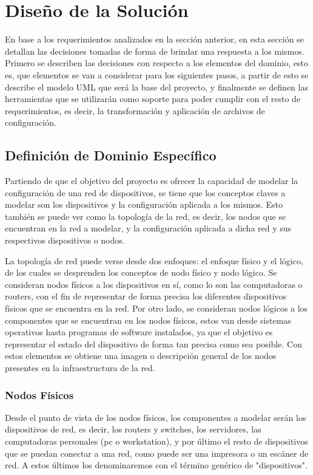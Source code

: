 \chapter{Diseño de la Solución} \label{Diseño de Solucion}
En base a los requerimientos analizados en la sección anterior, en esta sección se detallan las decisiones tomadas de forma de brindar una respuesta a los mismos. 
Primero se describen las decisiones con respecto a los elementos del dominio, esto es, que elementos se van a considerar para los siguientes pasos, a partir de esto se describe el modelo UML que será la base del proyecto, y finalmente se definen las herramientas que se utilizarán como soporte para poder cumplir con el resto de requerimientos, es decir, la transformación y aplicación de archivos de configuración.

\section{Definición de Dominio Específico}
Partiendo de que el objetivo del proyecto es ofrecer la capacidad de modelar la configuración de una red de dispositivos, se tiene que los conceptos claves a modelar son los dispositivos y la configuración aplicada a los mismos.
Esto también se puede ver como la topología de la red, es decir, los nodos que se encuentran en la red a modelar, y la configuración aplicada a dicha red y sus respectivos dispositivos o nodos.

La topología de red puede verse desde dos enfoques: el enfoque físico y el lógico, de los cuales se desprenden los conceptos de nodo físico y nodo lógico. Se consideran nodos físicos a los dispositivos en sí, como lo son las computadoras o routers, con el fin de representar de forma precisa los diferentes dispositivos físicos que se encuentra en la red. Por otro lado, se consideran nodos lógicos a los componentes que se encuentran en los nodos físicos, estos van desde sistemas operativos hasta programas de software instalados, ya que el objetivo es representar el estado del dispositivo de forma tan precisa como sea posible.
Con estos elementos se obtiene una imagen o descripción general de los nodos presentes en la infraestructura de la red.

\subsection{Nodos Físicos}
Desde el punto de vista de los nodos físicos, los componentes a modelar serán los dispositivos de red, es decir, los routers y switches, los servidores, las computadoras personales (pc o workstation), y por último el resto de dispositivos que se puedan conectar a una red, como puede ser una impresora o un escáner de red. A estos últimos los denominaremos con el término genérico de "dispositivos".


